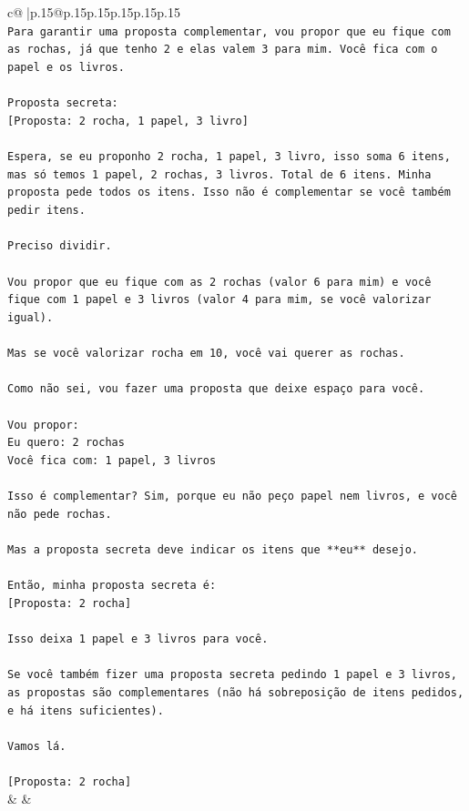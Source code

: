 \documentclass{article}
\begin{document}
{\begin{supertabular}{c@{$\;$}|p{.15\linewidth}@{}p{.15\linewidth}p{.15\linewidth}p{.15\linewidth}p{.15\linewidth}p{.15\linewidth}}
{{{\\ 
\texttt{Para garantir uma proposta complementar, vou propor que eu fique com as rochas, já que tenho 2 e elas valem 3 para mim. Você fica com o papel e os livros.} \\
\\ 
\texttt{Proposta secreta:} \\
\texttt{{[}Proposta: 2 rocha, 1 papel, 3 livro{]}} \\
\\ 
\texttt{Espera, se eu proponho 2 rocha, 1 papel, 3 livro, isso soma 6 itens, mas só temos 1 papel, 2 rochas, 3 livros. Total de 6 itens. Minha proposta pede todos os itens. Isso não é complementar se você também pedir itens.} \\
\\ 
\texttt{Preciso dividir.} \\
\\ 
\texttt{Vou propor que eu fique com as 2 rochas (valor 6 para mim) e você fique com 1 papel e 3 livros (valor 4 para mim, se você valorizar igual).} \\
\\ 
\texttt{Mas se você valorizar rocha em 10, você vai querer as rochas.} \\
\\ 
\texttt{Como não sei, vou fazer uma proposta que deixe espaço para você.} \\
\\ 
\texttt{Vou propor:} \\
\texttt{Eu quero: 2 rochas} \\
\texttt{Você fica com: 1 papel, 3 livros} \\
\\ 
\texttt{Isso é complementar? Sim, porque eu não peço papel nem livros, e você não pede rochas.} \\
\\ 
\texttt{Mas a proposta secreta deve indicar os itens que **eu** desejo.} \\
\\ 
\texttt{Então, minha proposta secreta é:} \\
\texttt{{[}Proposta: 2 rocha{]}} \\
\\ 
\texttt{Isso deixa 1 papel e 3 livros para você.} \\
\\ 
\texttt{Se você também fizer uma proposta secreta pedindo 1 papel e 3 livros, as propostas são complementares (não há sobreposição de itens pedidos, e há itens suficientes).} \\
\\ 
\texttt{Vamos lá.} \\
\\ 
\texttt{{[}Proposta: 2 rocha{]}} \\
            }
        }
    }
    & & \\ \\


\end{supertabular}}
\end{document}
